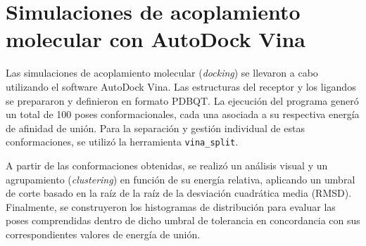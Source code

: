 \section{Simulaciones de acoplamiento molecular con AutoDock Vina}
Las simulaciones de acoplamiento molecular (\textit{docking}) se llevaron a cabo utilizando el software AutoDock Vina. Las estructuras del receptor y los ligandos se prepararon y definieron en formato PDBQT. La ejecución del programa generó un total de 100 poses conformacionales, cada una asociada a su respectiva energía de afinidad de unión. Para la separación y gestión individual de estas conformaciones, se utilizó la herramienta \texttt{vina\_split}.

A partir de las conformaciones obtenidas, se realizó un análisis visual y un agrupamiento (\textit{clustering}) en función de su energía relativa, aplicando un umbral de corte basado en la raíz de la raíz de la desviación cuadrática media (RMSD). Finalmente, se construyeron los histogramas de distribución para evaluar las poses comprendidas dentro de dicho umbral de tolerancia en concordancia con sus correspondientes valores de energía de unión.


